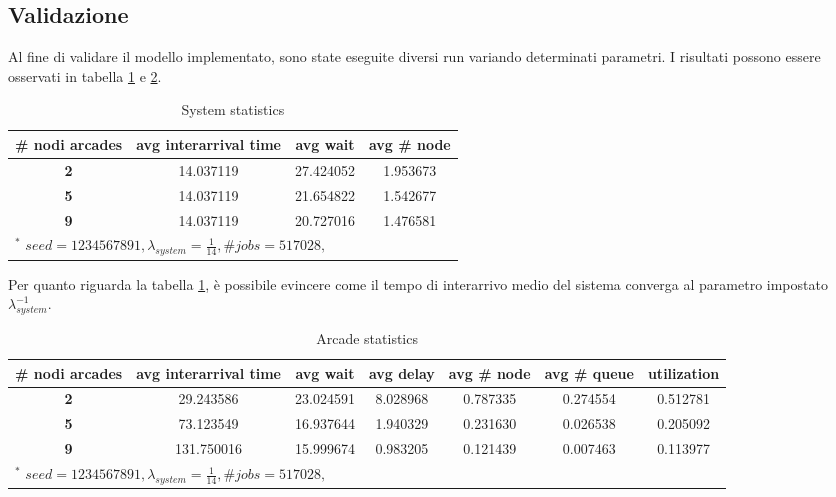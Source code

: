 \documentclass{article}
\begin{document}
\subsection{Validazione}
Al fine di validare il modello implementato, sono state eseguite diversi run variando determinati parametri. I risultati possono essere osservati in tabella \ref{tab1} e \ref{tab2}.

\begin{table}[htbp]
\caption{System statistics}
\begin{center}
\begin{tabular}{|c|c|c|c|}
\hline
\textbf{\# nodi arcades} & \textbf{avg interarrival time} & \textbf{avg wait} & \textbf{avg \# node} \\ \hline
\textbf{2} & 14.037119 & 27.424052 & 1.953673 \\ \hline
\textbf{5} & 14.037119 & 21.654822 & 1.542677 \\ \hline
\textbf{9} & 14.037119 &  20.727016 & 1.476581 \\ \hline
\multicolumn{4}{l}{$^{\mathrm{*}}$ $seed=1234567891, \lambda_{system} =\frac{1}{14} , \# jobs=517028, $}
\end{tabular}
\label{tab1}
\end{center}
\end{table}

Per quanto riguarda la tabella \ref{tab1}, è possibile evincere come il tempo di interarrivo medio del sistema converga al parametro impostato $\lambda_{system}^{-1}$.


\begin{table}[H]
\caption{Arcade statistics}
\begin{center}
\begin{tabular}{|c|c|c|c|c|c|c|}
\hline
\textbf{\# nodi arcades} & \textbf{avg interarrival time} & \textbf{avg wait} & \textbf{avg delay} & \textbf{avg \# node} & \textbf{avg \# queue} & \textbf{utilization} \\ \hline
\textbf{2} & 29.243586 & 23.024591 & 8.028968 & 0.787335 & 0.274554 & 0.512781\\ \hline
\textbf{5} & 73.123549 & 16.937644 & 1.940329 & 0.231630 & 0.026538 & 0.205092\\ \hline
\textbf{9} & 131.750016 & 15.999674 & 0.983205 & 0.121439 & 0.007463 & 0.113977\\ \hline
\multicolumn{7}{l}{$^{\mathrm{*}}$ $seed=1234567891, \lambda_{system} =\frac{1}{14} , \# jobs=517028, $}
\end{tabular}
\label{tab2}
\end{center}
\end{table}
\end{document}
